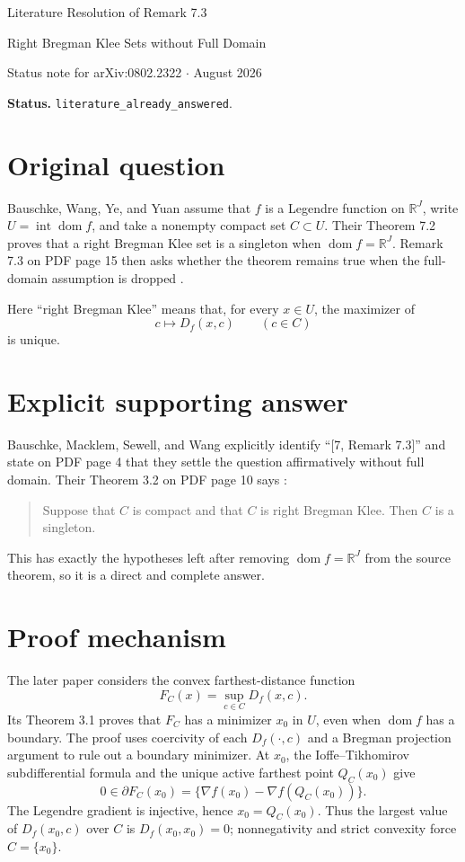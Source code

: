\documentclass[10pt]{article}
\begin{document}
\begin{center}
{\LARGE Literature Resolution of Remark 7.3\par}
\vspace{0.15em}
{\large Right Bregman Klee Sets without Full Domain\par}
\vspace{0.45em}
Status note for arXiv:0802.2322 \quad $\cdot$  August 2026
\end{center}
\vspace{0.25em}

\noindent\textbf{Status.} \texttt{literature\_already\_answered}.

\section*{Original question}
Bauschke, Wang, Ye, and Yuan assume that $f$ is a Legendre function on
$\mathbb R^J$, write $U=\operatorname{int}\operatorname{dom}f$, and take a
nonempty compact set $C\subset U$.  Their Theorem 7.2 proves that a right
Bregman Klee set is a singleton when $\operatorname{dom}f=\mathbb R^J$.
Remark 7.3 on PDF page 15 then asks whether the theorem remains true when the
full-domain assumption is dropped \cite{BWYY2008}.

Here ``right Bregman Klee'' means that, for every $x\in U$, the maximizer of
\[
  c\longmapsto D_f(x,c)
  \qquad(c\in C)
\]
is unique.

\section*{Explicit supporting answer}
Bauschke, Macklem, Sewell, and Wang explicitly identify ``[7, Remark 7.3]''
and state on PDF page 4 that they settle the question affirmatively without
full domain.  Their Theorem 3.2 on PDF page 10 says \cite{BMSW2009}:
\begin{quote}
Suppose that $C$ is compact and that $C$ is right Bregman Klee.  Then $C$ is
a singleton.
\end{quote}
This has exactly the hypotheses left after removing
$\operatorname{dom}f=\mathbb R^J$ from the source theorem, so it is a direct
and complete answer.

\section*{Proof mechanism}
The later paper considers the convex farthest-distance function
\[
  F_C(x)=\sup_{c\in C}D_f(x,c).
\]
Its Theorem 3.1 proves that $F_C$ has a minimizer $x_0$ in $U$, even when
$\operatorname{dom}f$ has a boundary.  The proof uses coercivity of each
$D_f(\cdot,c)$ and a Bregman projection argument to rule out a boundary
minimizer.  At $x_0$, the Ioffe--Tikhomirov subdifferential formula and the
unique active farthest point $Q_C(x_0)$ give
\[
  0\in\partial F_C(x_0)
  =\{\nabla f(x_0)-\nabla f(Q_C(x_0))\}.
\]
The Legendre gradient is injective, hence $x_0=Q_C(x_0)$.  Thus the largest
value of $D_f(x_0,c)$ over $C$ is $D_f(x_0,x_0)=0$; nonnegativity and strict
convexity force $C=\{x_0\}$.
\end{document}
